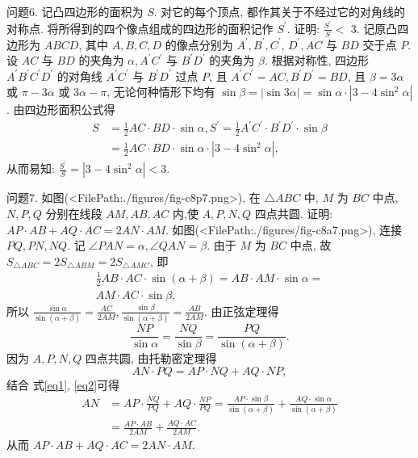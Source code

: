 问题6. 记凸四边形的面积为 $S$. 对它的每个顶点, 都作其关于不经过它的对角线的对称点.
将所得到的四个像点组成的四边形的面积记作 $S^{\prime}$. 证明: $\frac{S^{\prime}}{S}<$ 3. 
记原凸四边形为 $A B C D$, 其中 $A, B, C, D$ 的像点分别为 $A^{\prime}, B^{\prime}, C^{\prime}$, $D^{\prime}, A C$ 与 $B D$ 交于点 $P$.
设 $A C$ 与 $B D$ 的夹角为 $\alpha, A^{\prime} C^{\prime}$ 与 $B^{\prime} D^{\prime}$ 的夹角为 $\beta$. 根据对称性, 四边形 $A^{\prime} B^{\prime} C^{\prime} D^{\prime}$ 的对角线 $A^{\prime} C^{\prime}$ 与 $B^{\prime} D^{\prime}$ 过点 $P$, 且 $A^{\prime} C^{\prime}=A C, B^{\prime} D^{\prime}=B D$, 且 $\beta=3 \alpha$ 或 $\pi-3 \alpha$ 或 $3 \alpha-\pi$, 无论何种情形下均有 $\sin \beta=|\sin 3 \alpha|=\sin \alpha \cdot\left|3-4 \sin ^2 \alpha\right|$.
由四边形面积公式得
$$
\begin{aligned}
S & =\frac{1}{2} A C \cdot B D \cdot \sin \alpha, S^{\prime}=\frac{1}{2} A^{\prime} C^{\prime} \cdot B^{\prime} D^{\prime} \cdot \sin \beta \\
& =\frac{1}{2} A C \cdot B D \cdot \sin \alpha \cdot\left|3-4 \sin ^2 \alpha\right|,
\end{aligned}
$$
从而易知: $\frac{S^{\prime}}{S}=\left|3-4 \sin ^2 \alpha\right|<3$.



问题7. 如图(<FilePath:./figures/fig-c8p7.png>), 在 $\triangle A B C$ 中, $M$ 为 $B C$ 中点, $N, P, Q$ 分别在线段 $A M, A B, A C$ 内,使 $A, P, N, Q$ 四点共圆.
证明: $A P \cdot A B+A Q \cdot A C=2 A N \cdot A M$.
如图(<FilePath:./figures/fig-c8a7.png>), 连接 $P Q, P N, N Q$. 记 $\angle P A N=\alpha, \angle Q A N= \beta$. 由于 $M$ 为 $B C$ 中点, 故 $S_{\triangle A B C}=2 S_{\triangle A B M}=2 S_{\triangle A M C}$, 即
$$
\begin{gathered}
\frac{1}{2} A B \cdot A C \cdot \sin (\alpha+\beta)=A B \cdot A M \cdot \sin \alpha= \\
A M \cdot A C \cdot \sin \beta,
\end{gathered}
$$
所以 $\frac{\sin \alpha}{\sin (\alpha+\beta)}=\frac{A C}{2 A M}, \frac{\sin \beta}{\sin (\alpha+\beta)}=\frac{A B}{2 A M}$. \label{eq1}
由正弦定理得
$$
\frac{N P}{\sin \alpha}=\frac{N Q}{\sin \beta}=\frac{P Q}{\sin (\alpha+\beta)} . \label{eq2}
$$
因为 $A, P, N, Q$ 四点共圆, 由托勒密定理得
$$
A N \cdot P Q=A P \cdot N Q+A Q \cdot N P,
$$
结合 式\ref{eq1}, \ref{eq2}可得
$$
\begin{aligned}
A N & =A P \cdot \frac{N Q}{P Q}+A Q \cdot \frac{N P}{P Q}=\frac{A P \cdot \sin \beta}{\sin (\alpha+\beta)}+\frac{A Q \cdot \sin \alpha}{\sin (\alpha+\beta)} \\
& =\frac{A P \cdot A B}{2 A M}+\frac{A Q \cdot A C}{2 A M} .
\end{aligned}
$$
从而 $A P \cdot A B+A Q \cdot A C=2 A N \cdot A M$.



